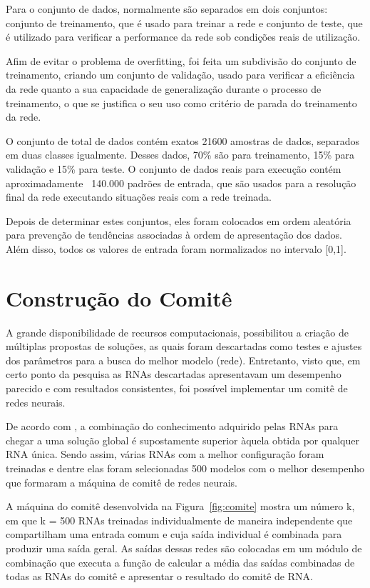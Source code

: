 Para o conjunto de dados, normalmente são separados em dois conjuntos: conjunto de treinamento, que é usado para treinar a rede e conjunto de teste, que é utilizado para verificar a performance da rede sob condições reais de utilização. 

Afim de evitar o problema de overfitting, foi feita um subdivisão do conjunto de treinamento, criando um conjunto de validação, usado para verificar a eficiência da rede quanto a sua capacidade de generalização durante o processo de treinamento, o que se justifica o seu uso como critério de parada do treinamento da rede.

O conjunto de total de dados contém exatos 21600 amostras de dados, separados em duas classes igualmente. Desses dados, 70\% são para treinamento, 15\% para validação e 15\% para teste. O conjunto de dados reais para execução contém aproximadamente ~140.000 padrões de entrada, que são usados para a resolução final da rede executando situações reais com a rede treinada.

Depois de determinar estes conjuntos, eles foram colocados em ordem aleatória para prevenção de tendências associadas à ordem de apresentação dos dados. Além disso, todos os valores de entrada foram normalizados no intervalo [0,1].

\section{Construção do Comitê}

A grande disponibilidade de recursos computacionais, possibilitou a criação de múltiplas propostas de soluções, as quais foram descartadas como testes e ajustes dos parâmetros para a busca do melhor modelo (rede). Entretanto, visto que, em certo ponto da pesquisa as RNAs descartadas apresentavam um desempenho parecido e com resultados consistentes, foi possível implementar um comitê de redes neurais.

De acordo com \cite{haykin1994neural}, a combinação do conhecimento adquirido pelas RNAs para chegar a uma solução global é supostamente superior àquela obtida por qualquer RNA única. Sendo assim, várias RNAs com a melhor configuração foram treinadas e dentre elas foram selecionadas 500 modelos com o melhor desempenho que formaram a máquina de comitê de redes neurais.

A máquina do comitê desenvolvida na Figura~\ref{fig:comite} mostra um número k, em que k = 500 RNAs treinadas individualmente de maneira independente que compartilham uma entrada comum e cuja saída individual é combinada para produzir uma saída geral. As saídas dessas redes são colocadas em um módulo de combinação que executa a função de calcular a média das saídas combinadas de todas as RNAs do comitê e apresentar o resultado do comitê de RNA.

